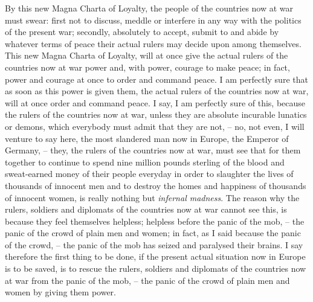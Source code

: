 By this new Magna Charta of Loyalty,
the people of the countries now at war must swear:
first not to discuss, meddle or interfere in any way with the politics of the present war;
secondly, absolutely to accept,
submit to and abide by whatever terms of peace their actual rulers may decide upon among themselves.
This new Magna Charta of Loyalty,
will at once give the actual rulers of the countries now at war power and,
with power, courage to make peace;
in fact, power and courage at once to order and command peace.
I am perfectly sure that as soon as this power is given them,
the actual rulers of the countries now at war, will at once order and command peace.
I say, I am perfectly sure of this, because the rulers of the countries now at war,
unless they are absolute incurable lunatics or demons,
which everybody must admit that they are not,
-- no, not even, I will venture to say here, the most slandered man now in Europe,
the Emperor of Germany,
-- they, the rulers of the countries now at war,
must see that for them together to continue to spend nine million pounds sterling of the blood and sweat-earned money of their people everyday
in order to slaughter the lives of thousands of innocent men and
to destroy the homes and happiness of thousands of innocent women,
is really nothing but \emph{infernal madness}.
The reason why the rulers,
soldiers and diplomats of the countries now at war cannot see this,
is because they feel themselves helpless;
helpless before the panic of the mob,
-- the panic of the crowd of plain men and women;
in fact, as I said because the panic of the crowd,
-- the panic of the mob has seized and paralysed their brains.
I say therefore the first thing to be done,
if the present actual situation now in Europe is to be saved,
is to rescue the rulers,
soldiers and diplomats of the countries now at war from the panic of the mob,
-- the panic of the crowd of plain men and women by giving them power.

